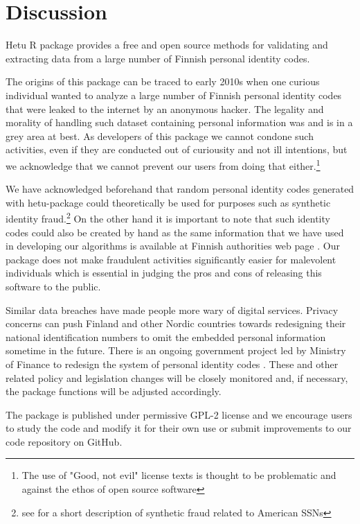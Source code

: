 \section{Discussion}

Hetu R package provides a free and open source methods for validating and extracting data from a large number of Finnish personal identity codes. 

The origins of this package can be traced to early 2010s when one curious individual wanted to analyze a large number of Finnish personal identity codes that were leaked to the internet by an anonymous hacker. The legality and morality of handling such dataset containing personal information was and is in a grey area at best. As developers of this package we cannot condone such activities, even if they are conducted out of curiousity and not ill intentions, but we acknowledge that we cannot prevent our users from doing that either.\footnote{The use of "Good, not evil" license texts is thought to be problematic and against the ethos of open source software} 

We have acknowledged beforehand that random personal identity codes generated with hetu-package could theoretically be used for purposes such as synthetic identity fraud.\footnote{see \citet[32]{brensinger2021} for a short description of synthetic fraud related to American SSNs} On the other hand it is important to note that such identity codes could also be created by hand as the same information that we have used in developing our algorithms is available at Finnish authorities web page \citep{hetudvv}. Our package does not make fraudulent activities significantly easier for malevolent individuals which is essential in judging the pros and cons of releasing this software to the public.

Similar data breaches have made people more wary of digital services. Privacy concerns can push Finland and other Nordic countries towards redesigning their national identification numbers to omit the embedded personal information sometime in the future. There is an ongoing government project led by Ministry of Finance to redesign the system of personal identity codes \citep{hetuvm}. These and other related policy and legislation changes will be closely monitored and, if necessary, the package functions will be adjusted accordingly.

The package is published under permissive GPL-2 license and we encourage users to study the code and modify it for their own use or submit improvements to our code repository on GitHub. 



\address{Pyry Kantanen\\
  University of Turku\\
  Turku Data Science Group, Agora, 20014 University of Turku\\
  Finland\\}

\address{Leo Lahti\\
  University of Turku\\
  Turku Data Science Group, Agora, 20014 University of Turku\\
  Finland\\}
